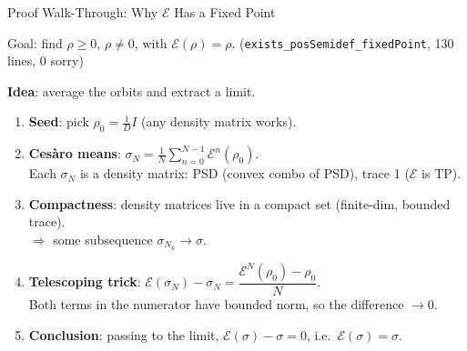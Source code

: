 \documentclass[aspectratio=169,10pt]{beamer}
\begin{document}
\begin{frame}{Proof Walk-Through: Why $\mathcal{E}$ Has a Fixed Point}
    \vspace{-0.5em}

    {\small\textcolor{dimwhite}{Goal: find $\rho \geq 0$, $\rho \neq 0$, with
    $\mathcal{E}(\rho) = \rho$.
    \quad(\texttt{exists\_posSemidef\_fixedPoint}, 130 lines, 0 sorry)}}

    \vspace{0.4em}
    \textbf{Idea}: average the orbits and extract a limit.

    \begin{enumerate}\itemsep0.2em\small
        \item \textbf{Seed}: pick $\rho_0 = \frac{1}{D}I$
            \quad (any density matrix works).

        \item \textbf{Cesàro means}: $\displaystyle\sigma_N
            = \frac{1}{N}\sum_{n=0}^{N-1}\mathcal{E}^n(\rho_0)$.\\
            Each $\sigma_N$ is a density matrix:
            {\footnotesize PSD (convex combo of PSD), trace 1 ($\mathcal{E}$ is TP).}

        \item \textbf{Compactness}: density matrices live in a compact set
            (finite-dim, bounded trace).\\
            $\Rightarrow$ some subsequence $\sigma_{N_k}\to\sigma$.

        \item \textbf{Telescoping trick}: $\mathcal{E}(\sigma_N) - \sigma_N
            = \dfrac{\mathcal{E}^N(\rho_0) - \rho_0}{N}$.\\[3pt]
            Both terms in the numerator have bounded norm, so the
            difference $\to 0$.

        \item \textbf{Conclusion}: passing to the limit,
            $\mathcal{E}(\sigma) - \sigma = 0$, i.e.\ $\mathcal{E}(\sigma) = \sigma$.
    \end{enumerate}

    \vspace{0.3em}
    \begin{center}
    \end{center}
\end{frame}
\end{document}
